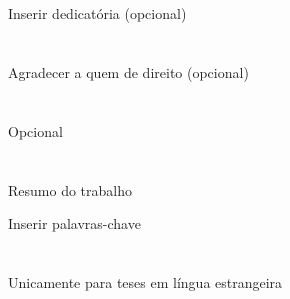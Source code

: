 \documentclass[10pt,twoside]{estiloUBI}
\begin{document}
\onehalfspacing





\pagestyle{fancy}


\cleardoublepage



\newpage 
\section*{}
\vspace{0.5cm}
Inserir dedicatória (opcional)
\cleardoublepage


\newpage 	
\section*{}
\vspace{0.5cm}
Agradecer a quem de direito (opcional)
\cleardoublepage


\newpage 	
\section*{}
\vspace{0.5cm}
Opcional
\cleardoublepage


\newpage 	
\section*{}
\vspace{0.5cm}
Resumo do trabalho
 
\vspace{2.2cm}
{}

\vspace{0.8cm}
Inserir palavras-chave
\cleardoublepage


\newpage 	
\section*{}
\vspace{0.5cm}
Unicamente para teses em língua estrangeira
\cleardoublepage
\end{document}
